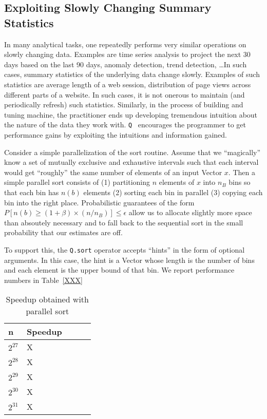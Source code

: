 \newcommand{\Q}{{\tt Q} }
\subsection{Exploiting Slowly Changing Summary Statistics}

In many analytical tasks, one repeatedly performs very similar operations on slowly
changing data. Examples are time series analysis to project the next 30 days
based on the last 90 days, anomaly detection, trend detection, \ldots In such
cases, summary statistics of the underlying data change slowly. Examples of such
statistics are average length of a web session, distribution of page views
across different parts of a website.  
In such cases, it is not onerous to
maintain (and periodically refresh) such statistics. 
Similarly, 
in the process of building and tuning machine, the practitioner ends up
developing tremendous intuition about the nature of the data they work with.
\Q\ encourages 
the programmer to get performance gains by exploiting the intuitions and
information gained.

Consider a simple parallelization of the sort routine. Assume that we 
``magically'' know a set of mutually exclusive and exhaustive intervals such
that each interval would get ``roughly'' the same number of elements of an input
Vector \(x\). Then a simple parallel sort consists of 
(1) partitioning \(n\) elements of \(x\) into \(n_B\) bins so that each bin has
\(n(b)\) elements
(2) sorting each bin in parallel
(3) copying each bin into the right place. Probabilistic guarantees
of the form \(P[n(b) \geq (1+\beta) \times(n/n_B)] \leq \epsilon\) 
allow us to allocate slightly more space than absoutely necessary and to 
fall back to the sequential sort in the small probability that our estimates are off.

To support this, the {\tt Q.sort} operator accepts ``hints'' in the form of
optional arguments. In this case, the hint is a Vector whose length is the
number of bins and each element is the upper bound of that bin. We report
performance numbers in Table~\ref{XXX}

\begin{table}
\centering
\begin{tabular}{|l|l|l|l|l|} \hline \hline
  {\bf n} & {\bf Speedup} \\ \hline \hline
  \(2^{27}\) & X \\ \hline
  \(2^{28}\) & X \\ \hline
  \(2^{29}\) & X \\ \hline
  \(2^{30}\) & X \\ \hline
  \(2^{31}\) & X \\ \hline
  \hline
\end{tabular}
\caption{Speedup obtained with parallel sort}
\label{tbl_sort_speedup}
\end{table}

